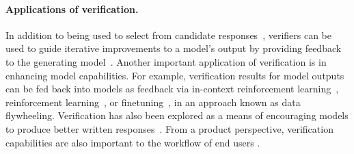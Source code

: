 \paragraph{Applications of verification.}
In addition to being used to select from candidate responses~\citep{cobbe_training_2021,li_making_2023,DBLP:conf/emnlp/WengZX0HLSLZ23,DBLP:conf/acl/JiangSYL0LK24,chen_simple_2024,DBLP:conf/nips/XieKZZKHX23}, verifiers can be used to guide iterative improvements to a model's output by providing feedback to the generating model~\citep{DBLP:conf/nips/KimBM23,xue_rcot_2023,valmeekam2023largelanguagemodelsreally,wu_large_2024,DBLP:conf/iclr/0009CMZYSZ24,DBLP:conf/acl/DhuliawalaKXRLC24, stechly2024chainthoughtlessnessanalysiscot, stechly2024selfverificationlimitationslargelanguage,qu_recursive_2024,DBLP:conf/icml/HavrillaRNDZHR24,ko_real-time_2025}. 
Another important application of verification is in enhancing model capabilities.
For example, verification results for model outputs can be fed back into models as feedback via in-context reinforcement learning~\citep{shinn_reflexion_2023}, reinforcement learning~\citep{uesato_solving_2022,peng_check_2023,madaan_self-refine_2023,kumar_training_2024, chow_inference-aware_2024}, or finetuning~\citep{ welleck_generating_2022,paul_refiner_2024,an_learning_2024,DBLP:journals/tmlr/SinghCAAPGLH0XP24}, in an approach known as data flywheeling.
Verification has also been explored as a means of encouraging models to produce better written responses~\citep{anil_learning_2021,kirchner2024proververifiergamesimprovelegibility}.
From a product perspective, verification capabilities are also important to the workflow of end users \citep{collins_evaluating_nodate}.
